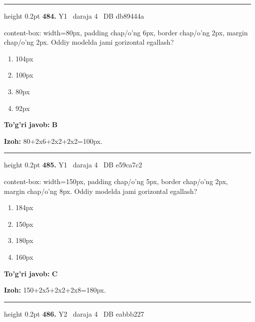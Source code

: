 \documentclass[10pt,a4paper,oneside]{article}
\begin{document}
\vspace{2mm}\hrule height 0.2pt \vspace{4mm}
\hypertarget{q484}{\textbf{\color{ink}484.}}  {\color{muted}\scriptsize Y1 \textbullet\ daraja 4 \textbullet\ DB db89444a}
\par
content-box: width=80px, padding chap/o'ng 6px, border chap/o'ng 2px, margin chap/o'ng 2px. Oddiy modelda jami gorizontal egallash?
\begin{enumerate}[label=\Alph*),leftmargin=9mm]
\item 104px
\item 100px
\item 80px
\item 92px
\end{enumerate}
\begin{tcolorbox}[enhanced,breakable,colback=teal!4,colframe=teal!45!black,boxrule=0.45pt,arc=1.2mm,left=2.8mm,right=2.8mm,top=2mm,bottom=2mm,before skip=2mm,after skip=2mm]
\textbf{\color{teal}To'g'ri javob:} \textbf{B}
\par\smallskip
\textbf{Izoh:} 80+2x6+2x2+2x2=100px.
\end{tcolorbox}
\vspace{2mm}\hrule height 0.2pt \vspace{4mm}
\hypertarget{q485}{\textbf{\color{ink}485.}}  {\color{muted}\scriptsize Y1 \textbullet\ daraja 4 \textbullet\ DB e59ca7c2}
\par
content-box: width=150px, padding chap/o'ng 5px, border chap/o'ng 2px, margin chap/o'ng 8px. Oddiy modelda jami gorizontal egallash?
\begin{enumerate}[label=\Alph*),leftmargin=9mm]
\item 184px
\item 150px
\item 180px
\item 160px
\end{enumerate}
\begin{tcolorbox}[enhanced,breakable,colback=teal!4,colframe=teal!45!black,boxrule=0.45pt,arc=1.2mm,left=2.8mm,right=2.8mm,top=2mm,bottom=2mm,before skip=2mm,after skip=2mm]
\textbf{\color{teal}To'g'ri javob:} \textbf{C}
\par\smallskip
\textbf{Izoh:} 150+2x5+2x2+2x8=180px.
\end{tcolorbox}
\vspace{2mm}\hrule height 0.2pt \vspace{4mm}
\hypertarget{q486}{\textbf{\color{ink}486.}}  {\color{muted}\scriptsize Y2 \textbullet\ daraja 4 \textbullet\ DB eabbb227}
\end{document}
